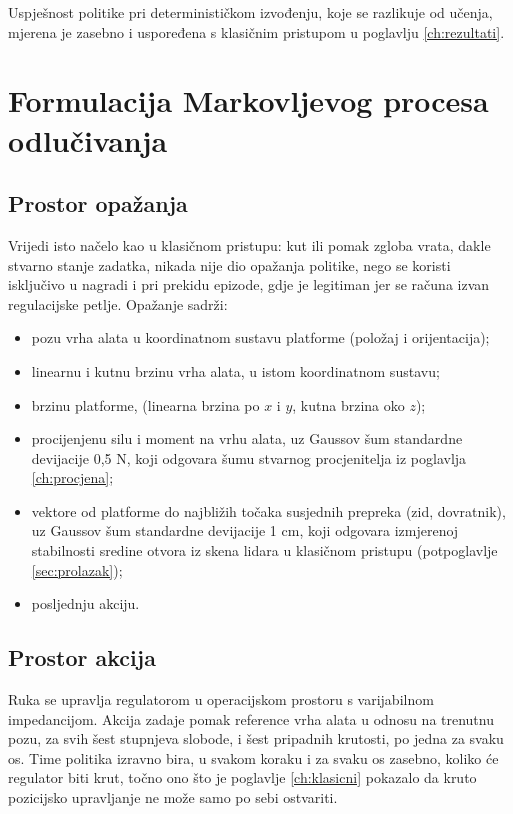 Uspješnost politike pri determinističkom izvođenju, koje se razlikuje od učenja, mjerena je
zasebno i uspoređena s klasičnim pristupom u poglavlju \ref{ch:rezultati}.

\section{Formulacija Markovljevog procesa odlučivanja}
\label{sec:mdp}

\subsection{Prostor opažanja}
\label{sec:opazanje}

Vrijedi isto načelo kao u klasičnom pristupu: kut ili pomak zgloba vrata, dakle stvarno stanje
zadatka, nikada nije dio opažanja politike, nego se koristi isključivo u nagradi i pri prekidu epizode,
gdje je legitiman jer se računa izvan regulacijske petlje. Opažanje sadrži:

\begin{itemize}
    \item pozu vrha alata u koordinatnom sustavu platforme (položaj i orijentacija);
    \item linearnu i kutnu brzinu vrha alata, u istom koordinatnom sustavu;
    \item brzinu platforme, (linearna brzina po $x$ i $y$, kutna brzina oko $z$);
    \item procijenjenu silu i moment na vrhu alata, uz Gaussov šum standardne devijacije
          0,5 N, koji odgovara šumu stvarnog procjenitelja iz poglavlja \ref{ch:procjena};
    \item vektore od platforme do najbližih točaka susjednih prepreka (zid, dovratnik), uz
          Gaussov šum standardne devijacije 1 cm, koji odgovara izmjerenoj stabilnosti sredine
          otvora iz skena lidara u klasičnom pristupu (potpoglavlje \ref{sec:prolazak});
    \item posljednju akciju.
\end{itemize}

\subsection{Prostor akcija}
\label{sec:akcije}

Ruka se upravlja regulatorom u operacijskom prostoru s varijabilnom impedancijom. Akcija zadaje
pomak reference vrha alata u odnosu na trenutnu pozu, za svih šest stupnjeva slobode, i šest
pripadnih krutosti, po jedna za svaku os. Time politika izravno bira, u svakom koraku i za
svaku os zasebno, koliko će regulator biti krut, točno ono što je poglavlje
\ref{ch:klasicni} pokazalo da kruto pozicijsko upravljanje ne može samo po sebi ostvariti.

